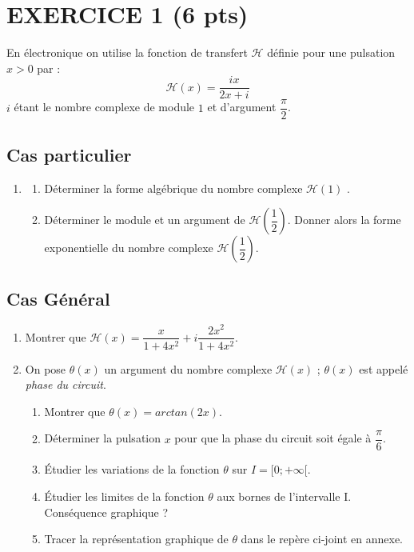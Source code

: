 \documentclass[12pt]{article}
\begin{document}
\setlength{\columnseprule}{0pt}

\section*{EXERCICE 1 (6 pts) } %

En électronique on utilise la fonction de transfert $\mathcal{H}$ définie pour une pulsation $x > 0$ par :
$$\mathcal{H}(x) = \frac{ix}{2x + i}$$
$i$ étant le nombre complexe de module $1$ et d'argument $\dfrac{\pi}{2}$.

\subsection*{Cas particulier}

\begin{enumerate}
\item[1.]
  \begin{enumerate}
  \item[a.] Déterminer la forme algébrique du nombre complexe $\mathcal{H}(1)$ .
  \item[b.] Déterminer le module et un argument de $\mathcal{H}\left(\dfrac{1}{2} \right)$. Donner alors la forme exponentielle du nombre complexe $\mathcal{H}\left(\dfrac{1}{2} \right)$.
  \end{enumerate}
\end{enumerate}

\subsection*{Cas Général}

\begin{enumerate}
\item[2.] Montrer que $\mathcal{H}(x) = \dfrac{x}{1 + 4x^2} +  i \dfrac{2x^2}{1 + 4x^2} $.
\item[3.] On pose $\theta (x)$ un argument du nombre complexe $\mathcal{H}(x)$ ; $\theta(x)$ est appelé \textit{phase du circuit}.

  \begin{enumerate}
  \item[a.] Montrer que $\theta(x) = arctan(2x)$.
  \item[b.] Déterminer la pulsation $x$ pour que la phase du circuit soit égale à $\dfrac{\pi}{6}$.
  \item[c.] Étudier les variations de la fonction $\theta$ sur $I = [ 0 ; +\infty [$.
    \item[d.] Étudier les limites de la fonction $\theta$ aux bornes de l'intervalle I. Conséquence graphique ?
    \item[e.] Tracer la représentation graphique de $\theta$ dans le repère ci-joint en annexe.
  \end{enumerate}

\end{enumerate}
\end{document}
